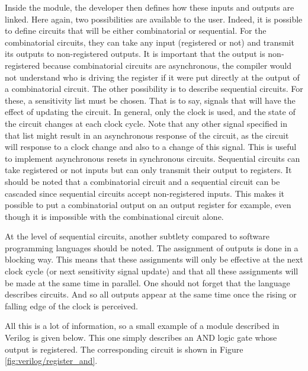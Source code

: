 Inside the module, the developer then defines how these inputs and outputs are linked. Here again, 
two possibilities are available to the user. Indeed, it is possible to define circuits that will be 
either combinatorial or sequential. For the combinatorial circuits, they can take any input 
(registered or not) and transmit its outputs to non-registered outputs. It is important that the 
output is non-registered because combinatorial circuits are asynchronous, the compiler would not 
understand who is driving the register if it were put directly at the output of a combinatorial 
circuit. The other possibility is to describe sequential circuits. For these, a sensitivity list 
must be chosen. That is to say, signals that will have the effect of updating the circuit. In 
general, only the clock is used, and the state of the circuit changes at each clock cycle. Note that
any other signal specified in that list might result in an asynchronous response of the circuit, as
the circuit will response to a clock change and also to a change of this signal. This is useful to
implement asynchronous resets in synchronous circuits. Sequential circuits can take registered or
not inputs but can only transmit their output to registers. It should be noted that a combinatorial 
circuit and a sequential circuit can be cascaded since sequential circuits accept non-registered 
inputs. This makes it possible to put a combinatorial output on an output register for example, even
though it is impossible with the combinational circuit alone. 

At the level of sequential circuits, another subtlety compared to software programming languages 
should be noted. The assignment of outputs is done in a blocking way. This means that these 
assignments will only be effective at the next clock cycle (or next sensitivity signal update) and 
that all these assignments will be made at the same time in parallel. One should not forget that the 
language describes circuits. And so all outputs appear at the same time once the rising or falling 
edge of the clock is perceived.

All this is a lot of information, so a small example of a module described in Verilog is given 
below. This one simply describes an AND logic gate whose output is registered. The corresponding 
circuit is shown in Figure \ref{fig:verilog/register_and}.

